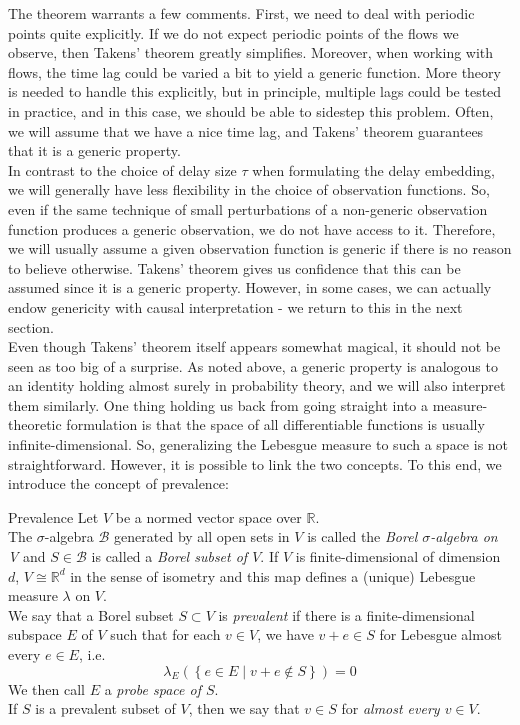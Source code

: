 \documentclass[11pt, a4paper]{memoir}
\theoremstyle{break}
\theoremstyle{break}
\theoremstyle{nonumberplain}
\newcommand{\mR}{\mathbb{R}}
\begin{document}
The theorem warrants a few comments. First, we need to deal with periodic points quite explicitly. If we do not expect periodic points of the flows we observe, then Takens' theorem greatly simplifies. Moreover, when working with flows, the time lag could be varied a bit to yield a generic function. More theory is needed to handle this explicitly, but in principle, multiple lags could be tested in practice, and in this case, we should be able to sidestep this problem. Often, we will assume that we have a nice time lag, and Takens' theorem guarantees that it is a generic property. \\[5pt]
In contrast to the choice of delay size $\tau$ when formulating the delay embedding, we will generally have less flexibility in the choice of observation functions. So, even if the same technique of small perturbations of a non-generic observation function produces a generic observation, we do not have access to it. Therefore, we will usually assume a given observation function is generic if there is no reason to believe otherwise. Takens' theorem gives us confidence that this can be assumed since it is a generic property. However, in some cases, we can actually endow genericity with causal interpretation - we return to this in the next section.\\[5pt]
Even though Takens' theorem itself appears somewhat magical, it should not be seen as too big of a surprise. As noted above, a generic property is analogous to an identity holding almost surely in probability theory, and we will also interpret them similarly. One thing holding us back from going straight into a measure-theoretic formulation is that the space of all differentiable functions is usually infinite-dimensional. So, generalizing the Lebesgue measure to such a space is not straightforward. However, it is possible to link the two concepts. To this end, we introduce the concept of prevalence:
\begin{mydefinition}{Prevalence}
Let $V$ be a normed vector space over $\mR$.\\[5pt]
The $\sigma$-algebra $\mathcal{B}$ generated by all open sets in $V$ is called the \emph{Borel $\sigma$-algebra on V} and $S\in \mathcal{B}$ is called a \emph{Borel subset of $V$}. If $V$ is finite-dimensional of dimension $d$, $V\cong \mR^d$ in the sense of isometry and this map defines a (unique) Lebesgue measure $\lambda $ on $V$.\\[5pt]
We say that a Borel subset $S\subset V$ is \emph{prevalent} if there is a finite-dimensional subspace $E$ of $V$ such that for each $v\in V$, we have $v+e\in S$ for Lebesgue almost every $e\in E$, i.e.
$$\lambda_E\left(\left\{e\in E\mid v+e\notin S\right\}\right)=0$$
We then call $E$ a \emph{probe space of $S$}.\\[5pt]
If $S$ is a prevalent subset of $V$, then we say that $v\in S$ for \emph{almost every $v\in V$}.
\end{mydefinition}
\end{document}
